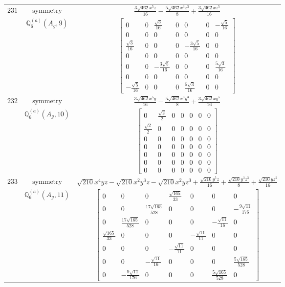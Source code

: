 \documentclass[fleqn,8pt,landscape]{jsarticle}
\begin{document}
\begin{longtable}{ccc}
$ 231 $ & $ \text{symmetry} $ & $ \frac{3 \sqrt{462} x^{5} z}{16} - \frac{5 \sqrt{462} x^{3} z^{3}}{8} + \frac{3 \sqrt{462} x z^{5}}{16} $ \\
$  $ & $ \mathbb{Q}_{6}^{(a)}(A_{g},9) $ & $ \begin{bmatrix} 0 & 0 & \frac{\sqrt{3}}{16} & 0 & 0 & 0 & - \frac{\sqrt{5}}{16} \\ 0 & 0 & 0 & 0 & 0 & 0 & 0 \\ \frac{\sqrt{3}}{16} & 0 & 0 & 0 & - \frac{3 \sqrt{5}}{16} & 0 & 0 \\ 0 & 0 & 0 & 0 & 0 & 0 & 0 \\ 0 & 0 & - \frac{3 \sqrt{5}}{16} & 0 & 0 & 0 & \frac{5 \sqrt{3}}{16} \\ 0 & 0 & 0 & 0 & 0 & 0 & 0 \\ - \frac{\sqrt{5}}{16} & 0 & 0 & 0 & \frac{5 \sqrt{3}}{16} & 0 & 0 \end{bmatrix} $ \\ \hline
$ 232 $ & $ \text{symmetry} $ & $ \frac{3 \sqrt{462} x^{5} y}{16} - \frac{5 \sqrt{462} x^{3} y^{3}}{8} + \frac{3 \sqrt{462} x y^{5}}{16} $ \\
$  $ & $ \mathbb{Q}_{6}^{(a)}(A_{g},10) $ & $ \begin{bmatrix} 0 & \frac{\sqrt{2}}{2} & 0 & 0 & 0 & 0 & 0 \\ \frac{\sqrt{2}}{2} & 0 & 0 & 0 & 0 & 0 & 0 \\ 0 & 0 & 0 & 0 & 0 & 0 & 0 \\ 0 & 0 & 0 & 0 & 0 & 0 & 0 \\ 0 & 0 & 0 & 0 & 0 & 0 & 0 \\ 0 & 0 & 0 & 0 & 0 & 0 & 0 \\ 0 & 0 & 0 & 0 & 0 & 0 & 0 \end{bmatrix} $ \\ \hline
$ 233 $ & $ \text{symmetry} $ & $ \sqrt{210} x^{4} y z - \sqrt{210} x^{2} y^{3} z - \sqrt{210} x^{2} y z^{3} + \frac{\sqrt{210} y^{5} z}{16} + \frac{\sqrt{210} y^{3} z^{3}}{8} + \frac{\sqrt{210} y z^{5}}{16} $ \\
$  $ & $ \mathbb{Q}_{6}^{(a)}(A_{g},11) $ & $ \begin{bmatrix} 0 & 0 & 0 & \frac{\sqrt{165}}{33} & 0 & 0 & 0 \\ 0 & 0 & \frac{17 \sqrt{165}}{528} & 0 & 0 & 0 & - \frac{9 \sqrt{11}}{176} \\ 0 & \frac{17 \sqrt{165}}{528} & 0 & 0 & 0 & - \frac{\sqrt{11}}{16} & 0 \\ \frac{\sqrt{165}}{33} & 0 & 0 & 0 & - \frac{\sqrt{11}}{11} & 0 & 0 \\ 0 & 0 & 0 & - \frac{\sqrt{11}}{11} & 0 & 0 & 0 \\ 0 & 0 & - \frac{\sqrt{11}}{16} & 0 & 0 & 0 & \frac{5 \sqrt{165}}{528} \\ 0 & - \frac{9 \sqrt{11}}{176} & 0 & 0 & 0 & \frac{5 \sqrt{165}}{528} & 0 \end{bmatrix} $ \\ \hline

\end{longtable}
\end{document}
